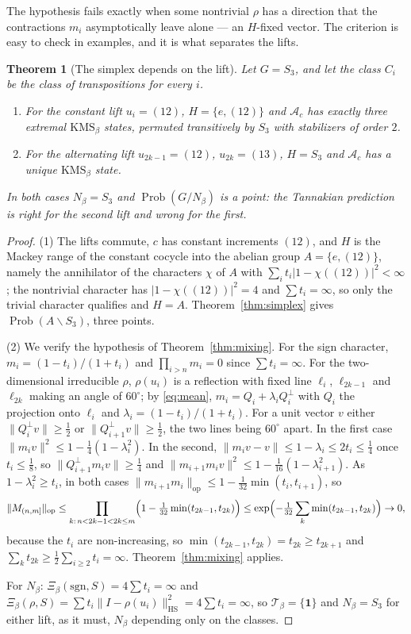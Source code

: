 \documentclass[11pt]{amsart}
\numberwithin{equation}{section}
\newtheorem{theorem}{Theorem}[section]
\theoremstyle{definition}
\theoremstyle{remark}
\newcommand{\cA}{\mathcal{A}}
\newcommand{\cT}{\mathcal{T}}
\newcommand{\HS}{\mathrm{HS}}
\newcommand{\Prob}{\operatorname{Prob}}
\newcommand{\op}{\mathrm{op}}
\begin{document}
The hypothesis fails exactly when some nontrivial $\rho$ has a direction that the
contractions $m_i$ asymptotically leave alone --- an $H$-fixed vector. The criterion is
easy to check in examples, and it is what separates the lifts.

\begin{theorem}[The simplex depends on the lift]\label{thm:lift}
Let $G=S_3$, and let the class $C_i$ be the class of transpositions for every $i$.
\begin{enumerate}
\item For the constant lift $u_i=(12)$, $H=\{e,(12)\}$ and $\cA_c$ has exactly three
extremal $\mathrm{KMS}_\beta$ states, permuted transitively by $S_3$ with stabilizers of
order $2$.
\item For the alternating lift $u_{2k-1}=(12)$, $u_{2k}=(13)$, $H=S_3$ and $\cA_c$ has a
unique $\mathrm{KMS}_\beta$ state.
\end{enumerate}
In both cases $N_\beta=S_3$ and $\Prob(G/N_\beta)$ is a point: the Tannakian prediction is
right for the second lift and wrong for the first.
\end{theorem}

\begin{proof}
(1) The lifts commute, $c$ has constant increments $(12)$, and $H$ is the Mackey range of
the constant cocycle into the abelian group $A=\{e,(12)\}$, namely the annihilator of the
characters $\chi$ of $A$ with $\sum_it_i|1-\chi((12))|^2<\infty$; the nontrivial character
has $|1-\chi((12))|^2=4$ and $\sum t_i=\infty$, so only the trivial character qualifies and
$H=A$. Theorem~\ref{thm:simplex} gives $\Prob(A\backslash S_3)$, three points.

(2) We verify the hypothesis of Theorem~\ref{thm:mixing}. For the sign character,
$m_i=(1-t_i)/(1+t_i)$ and $\prod_{i>n}m_i=0$ since $\sum t_i=\infty$. For the two-dimensional
irreducible $\rho$, $\rho(u_i)$ is a reflection with fixed line $\ell_i$, $\ell_{2k-1}$ and
$\ell_{2k}$ making an angle of $60^\circ$; by \eqref{eq:mean}, $m_i=Q_i+\lambda_iQ_i^\perp$
with $Q_i$ the projection onto $\ell_i$ and $\lambda_i=(1-t_i)/(1+t_i)$. For a unit vector $v$
either $\|Q_i^\perp v\|\ge\frac12$ or $\|Q_{i+1}^\perp v\|\ge\frac12$, the two lines being
$60^\circ$ apart. In the first case $\|m_iv\|^2\le1-\frac14(1-\lambda_i^2)$. In the second,
$\|m_iv-v\|\le1-\lambda_i\le2t_i\le\frac14$ once $t_i\le\frac18$, so
$\|Q_{i+1}^\perp m_iv\|\ge\frac14$ and $\|m_{i+1}m_iv\|^2\le1-\frac1{16}(1-\lambda_{i+1}^2)$.
As $1-\lambda_i^2\ge t_i$, in both cases
$\|m_{i+1}m_i\|_{\op}\le1-\frac1{32}\min(t_i,t_{i+1})$, so
\[
\|M_{(n,m]}\|_{\op}\le\prod_{k:\,n<2k-1<2k\le m}\Bigl(1-\tfrac1{32}\min(t_{2k-1},t_{2k})\Bigr)\le\exp\Bigl(-\tfrac1{32}\sum_{k}\min(t_{2k-1},t_{2k})\Bigr)\to0,
\]
because the $t_i$ are non-increasing, so $\min(t_{2k-1},t_{2k})=t_{2k}\ge t_{2k+1}$ and
$\sum_kt_{2k}\ge\frac12\sum_{i\ge2}t_i=\infty$. Theorem~\ref{thm:mixing} applies.

For $N_\beta$: $\Xi_\beta(\mathrm{sgn},S)=4\sum t_i=\infty$ and
$\Xi_\beta(\rho,S)=\sum t_i\|I-\rho(u_i)\|_{\HS}^2=4\sum t_i=\infty$, so $\cT_\beta=\{\mathbf 1\}$
and $N_\beta=S_3$ for either lift, as it must, $N_\beta$ depending only on the classes.
\end{proof}
\end{document}
